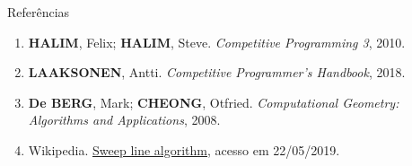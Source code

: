 \begin{frame}[fragile]{Referências}

    \begin{enumerate}
        \item \textbf{HALIM}, Felix; \textbf{HALIM}, Steve. \textit{Competitive Programming 3}, 2010.
        \item \textbf{LAAKSONEN}, Antti. \textit{Competitive Programmer's Handbook}, 2018.

        \item \textbf{De BERG}, Mark; \textbf{CHEONG}, Otfried. \textit{Computational Geometry: Algorithms and Applications}, 2008.

        \item Wikipedia. \href{https://en.wikipedia.org/wiki/Sweep_line_algorithm}{Sweep line algorithm}, acesso em 22/05/2019.

    \end{enumerate}

\end{frame}
